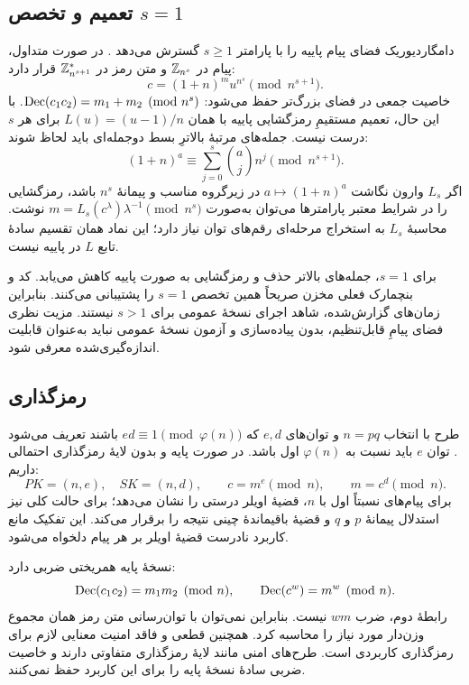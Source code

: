 \subsection{تعمیم  و تخصص \texorpdfstring{$s=1$}{s=1}}
دامگارد\lr{--}یوریک فضای پیام پاییه را با پارامتر $s\ge1$ گسترش می‌دهد \cite{ref181}. در صورت متداول، پیام در $\mathbb{Z}_{n^s}$ و متن رمز در $\mathbb{Z}_{n^{s+1}}^*$ قرار دارد:
\begin{equation}
c=(1+n)^m u^{n^s}\pmod{n^{s+1}}.
\end{equation}
خاصیت جمعی در فضای بزرگ‌تر حفظ می‌شود: $\operatorname{Dec}(c_1c_2)=m_1+m_2\pmod{n^s}$. با این حال، تعمیم مستقیمِ رمزگشایی پاییه با همان $L(u)=(u-1)/n$ برای هر $s$ درست نیست. جمله‌های مرتبۀ بالاترِ بسط دوجمله‌ای باید لحاظ شوند:
\begin{equation}
(1+n)^a\equiv\sum_{j=0}^{s}\binom{a}{j}n^j\pmod{n^{s+1}}.
\end{equation}
اگر $L_s$ وارون نگاشت $a\mapsto(1+n)^a$ در زیرگروه مناسب و پیمانۀ $n^s$ باشد، رمزگشایی را در شرایط معتبر پارامترها می‌توان به‌صورت $m=L_s(c^{\lambda})\lambda^{-1}\pmod{n^s}$ نوشت. محاسبۀ $L_s$ به استخراج مرحله‌ای رقم‌های توان نیاز دارد؛ این نماد همان تقسیم سادۀ تابع $L$ در پاییه نیست.

برای $s=1$، جمله‌های بالاتر حذف و رمزگشایی به صورت پاییه کاهش می‌یابد. کد و بنچمارک فعلی مخزن صریحاً همین تخصص $s=1$ را پشتیبانی می‌کنند. بنابراین زمان‌های گزارش‌شده، شاهد اجرای نسخۀ عمومی برای $s>1$ نیستند. مزیت نظری فضای پیامِ قابل‌تنظیم، بدون پیاده‌سازی و آزمون نسخۀ عمومی نباید به‌عنوان قابلیت اندازه‌گیری‌شده معرفی شود.

\subsection{رمزگذاری }
طرح  با انتخاب $n=pq$ و توان‌های $e,d$ که $ed\equiv1\pmod{\varphi(n)}$ باشند تعریف می‌شود \cite{ref182}. توان $e$ باید نسبت به $\varphi(n)$ اول باشد. در صورت پایه و بدون لایۀ رمزگذاری احتمالی داریم:
\begin{equation}
PK=(n,e),\quad SK=(n,d),\qquad c=m^e\pmod n,\qquad m=c^d\pmod n.
\label{eq:rsa}
\end{equation}
برای پیام‌های نسبتاً اول با $n$، قضیۀ اویلر درستی را نشان می‌دهد؛ برای حالت کلی نیز استدلال پیمانۀ $p$ و $q$ و قضیۀ باقیماندۀ چینی نتیجه را برقرار می‌کند. این تفکیک مانع کاربرد نادرست قضیۀ اویلر بر هر پیام دلخواه می‌شود.

نسخۀ پایه همریختی ضربی دارد:
\begin{equation}
\operatorname{Dec}(c_1c_2)=m_1m_2\pmod n,\qquad
\operatorname{Dec}(c^w)=m^w\pmod n.
\label{eq:rsa-homomorphism}
\end{equation}
رابطۀ دوم، ضرب $wm$ نیست. بنابراین نمی‌توان با توان‌رسانی متن رمز  همان مجموع وزن‌دار مورد نیاز را محاسبه کرد. همچنین  قطعی و فاقد امنیت معنایی لازم برای رمزگذاری کاربردی است. طرح‌های امنی مانند  لایۀ رمزگذاری متفاوتی دارند و خاصیت ضربی سادۀ نسخۀ پایه را برای این کاربرد حفظ نمی‌کنند.

